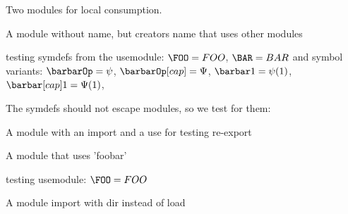 \documentclass[minimal]{omdoc}
\begin{document}
Two modules for local consumption.
 

A module without name, but creators name that uses other modules
\begin{module}[creators=miko]
  testing symdefs from the usemodule: $\FOO=FOO$, $\BAR=BAR$
  and symbol variants: $\barbarOp=\psi$, $\barbarOp[cap]=\Psi$, $\barbar1=\psi(1)$, $\barbar[cap]1=\Psi(1)$, 
\end{module}

The symdefs should not escape modules, so we test for them:
\ifx\FOO\undefined\else{}\fi

A module with an import and a use for testing re-export
\begin{module}[id=foobar]
\end{module}

A module  that uses 'foobar'
\begin{module}
  testing usemodule: $\FOO=FOO$
  \ifx\BAR\undefined\else{}\fi
\end{module}

A module import with dir instead of load
\begin{module}[id=foobarbar]
\end{module}
\end{document}
